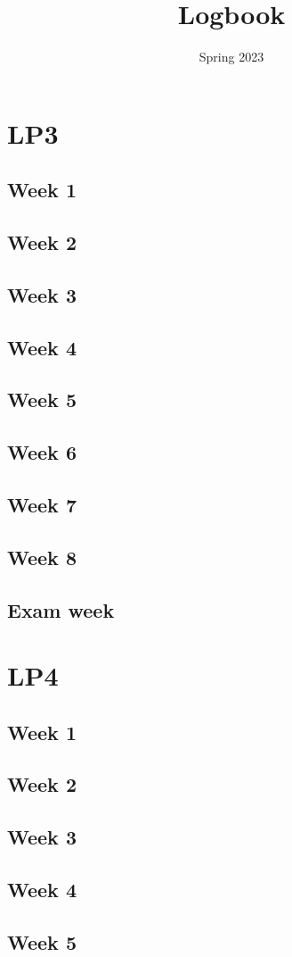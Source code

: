 \documentclass{article}
\title{Logbook}
\date{Spring 2023}
\newcommand{\logentry}[2]{
    \subsection{Week #2}
    
    \newpage
}
\newcommand{\customlogentry}[3]{
    \subsection{#3}
    
    \newpage
}
\begin{document}
\maketitle
\newpage
\tableofcontents
\newpage


\section{LP3}
    \logentry{3}{1}
    \logentry{3}{2}
    \logentry{3}{3}
    \logentry{3}{4}
    \logentry{3}{5}
    \logentry{3}{6}
    \logentry{3}{7}
    \logentry{3}{8}
    \customlogentry{3}{Exam}{Exam week}

\section{LP4}
    \logentry{4}{1}
    \logentry{4}{2}
    \logentry{4}{3}
    \logentry{4}{4}
    \logentry{4}{5}
\end{document}
